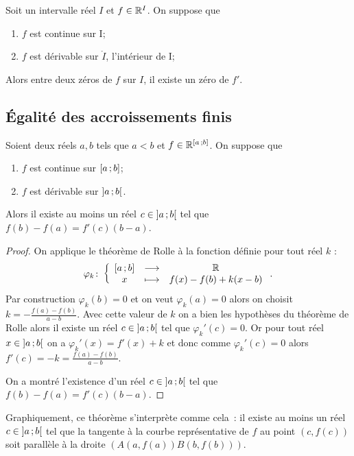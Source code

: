 \begin{corth}
  Soit un intervalle réel \(I\) et \(f \in \mathbb{R}^I\). On suppose que
  \begin{enumerate}
    \item \(f\) est continue sur I;
    \item \(f\) est dérivable sur \(\mathring{I}\), l'intérieur de I;
  \end{enumerate}
  Alors entre deux zéros de \(f\) sur \(I\), il existe un zéro de \(f'\).
\end{corth}

\subsection{Égalité des accroissements finis}

\begin{theo}
  Soient deux réels \(a,b\) tels que \(a < b\) et \(f \in
  \mathbb{R}^{\left[ a \, ; {} b \right]}\). On suppose que
  \begin{enumerate}
    \item \(f\) est continue sur \(\left[ a \, ; {} b \right]\);
    \item \(f\) est dérivable sur \(\left] a \, ; {} b \right[\).
  \end{enumerate}
Alors il existe au moins un réel \(c \in \left] a \, ; {} b \right[\) tel que
\(f(b)-f(a)=f'(c)(b-a)\). \end{theo}
\begin{proof}
  On applique le théorème de Rolle à la fonction définie pour tout réel \(k\) :
  \begin{equation}
    \varphi_k\colon\left\{\begin{array}{ccc}\left[ a \, ; {} b \right] & \longrightarrow &\mathbb{R}\\x & \longmapsto & f(x)-f(b)+k(x-b)\end{array}\right..
  \end{equation}
  Par construction \(\varphi_k(b)=0\) et on veut \(\varphi_k(a)=0\) alors on
  choisit \(k = -\frac{f(a)-f(b)}{a-b}\). Avec cette valeur de \(k\) on a bien
  les hypothèses du théorème de Rolle alors il existe un réel \(c \in
  \left] a \, ; {} b \right[\) tel que \(\varphi_k'(c)=0\). Or pour tout réel \(x \in
  \left] a \, ; {} b \right[\) on a \(\varphi_k'(x)=f'(x)+k\) et donc comme
  \(\varphi_k'(c)=0\) alors \(f'(c)=-k=\frac{f(a)-f(b)}{a-b}\).

  On a montré l'existence d'un réel \(c \in \left] a \, ; {} b \right[\) tel que
  \(f(b)-f(a)=f'(c)(b-a)\).
\end{proof}

Graphiquement, ce théorème s'interprète comme cela~: il existe au moins un réel
\(c \in \left] a \, ; {} b \right[\) tel que la tangente à la courbe représentative de
\(f\) au point \((c,f(c))\) soit parallèle à la droite \((A(a,f(a))B(b,f(b)))\).

